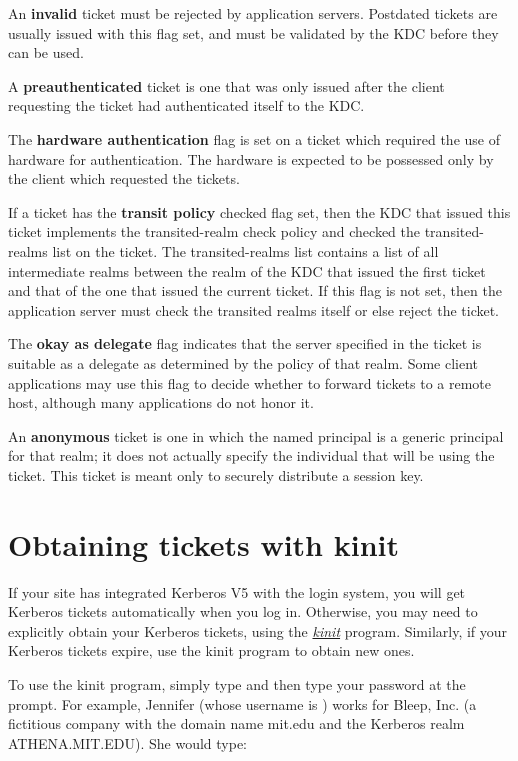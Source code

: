 \documentclass[letterpaper,10pt,english]{sphinxmanual}
\begin{document}
An \textbf{invalid} ticket must be rejected by application servers.
Postdated tickets are usually issued with this flag set, and must be
validated by the KDC before they can be used.

A \textbf{preauthenticated} ticket is one that was only issued after the
client requesting the ticket had authenticated itself to the KDC.

The \textbf{hardware authentication} flag is set on a ticket which required
the use of hardware for authentication.  The hardware is expected to
be possessed only by the client which requested the tickets.

If a ticket has the \textbf{transit policy} checked flag set, then the KDC
that issued this ticket implements the transited-realm check policy
and checked the transited-realms list on the ticket.  The
transited-realms list contains a list of all intermediate realms
between the realm of the KDC that issued the first ticket and that of
the one that issued the current ticket.  If this flag is not set, then
the application server must check the transited realms itself or else
reject the ticket.

The \textbf{okay as delegate} flag indicates that the server specified in
the ticket is suitable as a delegate as determined by the policy of
that realm.  Some client applications may use this flag to decide
whether to forward tickets to a remote host, although many
applications do not honor it.

An \textbf{anonymous} ticket is one in which the named principal is a
generic principal for that realm; it does not actually specify the
individual that will be using the ticket.  This ticket is meant only
to securely distribute a session key.


\section{Obtaining tickets with kinit}
\label{user/tkt_mgmt:obtaining-tickets-with-kinit}\label{user/tkt_mgmt:obtain-tkt}
If your site has integrated Kerberos V5 with the login system, you
will get Kerberos tickets automatically when you log in.  Otherwise,
you may need to explicitly obtain your Kerberos tickets, using the
{\hyperref[user/user_commands/kinit:kinit-1]{\emph{kinit}}} program.  Similarly, if your Kerberos tickets expire,
use the kinit program to obtain new ones.

To use the kinit program, simply type  and then type your
password at the prompt. For example, Jennifer (whose username is
) works for Bleep, Inc. (a fictitious company with the
domain name mit.edu and the Kerberos realm ATHENA.MIT.EDU).  She would
type:
\end{document}
